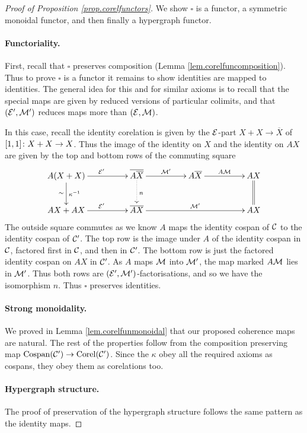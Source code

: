 \begin{proof}[Proof of Proposition \ref{prop.corelfunctors}] 
  We show $\square$ is a functor, a symmetric monoidal functor, and then finally
  a hypergraph functor.

  \paragraph{Functoriality.} First, recall that $\square$ preserves composition
  (Lemma \ref{lem.corelfuncomposition}). Thus to prove $\square$ is a functor it
  remains to show identities are mapped to identities. The general idea for this
  and for similar axioms is to recall that the special maps are given by reduced
  versions of particular colimits, and that $(\mathcal E',\mathcal M')$ reduces maps more
  than $(\mathcal E,\mathcal M)$. 

  In this case, recall the identity corelation is given by the $\mathcal E$-part $X+X
  \to \overline{X}$ of $[1,1]{\colon} X+X \to X$. Thus the image of the identity on
  $X$ and the identity on $AX$ are given by the top and bottom rows of the
  commuting square
  \[
    \xymatrixcolsep{4pc}
    \xymatrixrowsep{2pc}
    \xymatrix{
      A(X+X) \ar[d]^{\kappa^{-1}}_{\sim} \ar[r]^{\mc E'} &
      \overline{A\overline{X}} \ar[r]^{\mc M'} \ar@{.>}[d]^{n} &
      A\overline{X} \ar[r]^{A\mc M} & AX \ar@{=}[d]\\
      AX+AX \ar[r]^{\mc E'} & \overline{AX} \ar[rr]^{\mc M'} && AX
    }
  \]
  The outside square commutes as we know $A$ maps the identity cospan of $\mathcal C$
  to the identity cospan of $\mathcal C'$. The top row is the image under $A$ of the
  identity cospan in $\mathcal C$, factored first in $\mathcal C$, and then in $\mathcal C'$.
  The bottom row is just the factored identity cospan on $AX$ in $\mathcal C'$. As
  $A$ maps $\mathcal M$ into $\mathcal M'$, the map marked $A\mathcal M$ lies in $\mathcal M'$. Thus
  both rows are $(\mathcal E',\mathcal M')$-factorisations, and so we have the isomorphism
  $n$. Thus $\square$ preserves identities.

  \paragraph{Strong monoidality.} We proved in Lemma \ref{lem.corelfunmonoidal} that
    our proposed coherence maps are natural. The rest of the properties follow
    from the composition preserving map $\operatorname{{Cospan}}(\mathcal C') \to \operatorname{{Corel}}(\mathcal C')$.
    Since the $\kappa$ obey all the required axioms as cospans, they obey them
    as corelations too.

  \paragraph{Hypergraph structure.} The proof of preservation of the hypergraph
  structure follows the same pattern as the identity maps. 
\end{proof}

